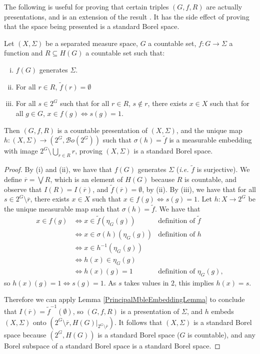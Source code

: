 \documentclass{lmcs}
\newcommand{\Bo}{\ensuremath{\mathcal{B}o}} %
\begin{document}
The following is useful for proving that certain triples $(G,f,R)$ are actually presentations, and is an extension of the result \cite[Lemma 10]{unresStoneProc}. It has the side effect of proving that the space being presented is a standard Borel space.
\begin{prop}
\label{CountablePresentationImpliesStandardProp}
Let $(X,\Sigma)$ be a separated measure space, $G$ a countable set, $f : G \rightarrow \Sigma$ a function and $R \subseteq H(G)$ a countable set such that:
\begin{enumerate}[(i)]
\item $f(G)$ generates $\Sigma$.
\item For all $r \in R$, $\tilde{f}(r) = \emptyset$
\item For all $s \in 2^G$ such that for all $r \in R$, $s \not\in r$, there exists $x \in X$ such that for all $g \in G$, $x \in f(g) \Leftrightarrow s(g) = 1$.
\end{enumerate}
Then $(G,f,R)$ is a countable presentation of $(X,\Sigma)$, and the unique map $h : (X,\Sigma) \rightarrow (2^G,\Bo(2^G))$ such that $\sigma(h) = \tilde{f}$ is a measurable embedding with image $2^G \setminus \bigcup_{r \in R} r$, proving $(X,\Sigma)$ is a standard Borel space. 
\end{prop}
\begin{proof}
By (i) and (ii), we have that $f(G)$ generates $\Sigma$ (\emph{i.e.} $\tilde{f}$ is surjective). We define $\overline{r} = \bigvee R$, which is an element of $H(G)$ because $R$ is countable, and observe that $I(R) = I(\overline{r})$, and $\tilde{f}(\overline{r}) = \emptyset$, by (ii). By (iii), we have that for all $s \in 2^G \setminus \overline{r}$, there exists $x \in X$ such that $x \in f(g) \Leftrightarrow s(g) = 1$. Let $h : X \rightarrow 2^G$ be the unique measurable map such that $\sigma(h) = \tilde{f}$. We have that
\begin{align*}
x \in f(g) & \Leftrightarrow x \in \tilde{f}(\eta_G(g)) & \text{definition of } \tilde{f} \\
 &\Leftrightarrow x \in \sigma(h)(\eta_G(g)) & \text{definition of } h \\
 &\Leftrightarrow x \in h^{-1}(\eta_G(g)) \\
 &\Leftrightarrow h(x) \in \eta_G(g) \\
 &\Leftrightarrow h(x)(g) = 1 &\text{definition of } \eta_G(g),
\end{align*}
so $h(x)(g) = 1 \Leftrightarrow s(g) = 1$. As $s$ takes values in $2$, this implies $h(x) = s$. 

Therefore we can apply Lemma \ref{PrincipalMbleEmbeddingLemma} to conclude that $I(\overline{r}) = \tilde{f}^{-1}(\emptyset)$, so $(G,f,R)$ is a presentation of $\Sigma$, and $h$ embeds $(X,\Sigma)$ onto $(2^G \setminus \overline{r}, H(G)|_{2^G \setminus \overline{r}})$. It follows that $(X,\Sigma)$ is a standard Borel space because $(2^G,H(G))$ is a standard Borel space ($G$ is countable), and any Borel subspace of a standard Borel space is a standard Borel space.
\end{proof}
\end{document}
